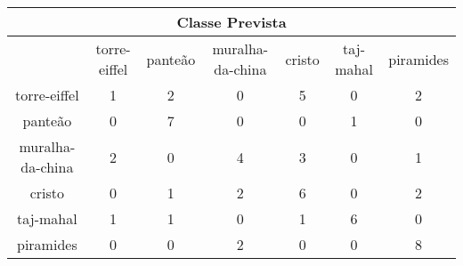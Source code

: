 \begin{tabular}{|c|c|c|c|c|c|c|}
\hline
\multicolumn{7}{|c|}{Classe Prevista}\\
\hline
 & torre-eiffel & panteão & muralha-da-china & cristo & taj-mahal & piramides\\
torre-eiffel & 1 & 2 & 0 & 5 & 0 & 2\\
panteão & 0 & 7 & 0 & 0 & 1 & 0\\
muralha-da-china & 2 & 0 & 4 & 3 & 0 & 1\\
cristo & 0 & 1 & 2 & 6 & 0 & 2\\
taj-mahal & 1 & 1 & 0 & 1 & 6 & 0\\
piramides & 0 & 0 & 2 & 0 & 0 & 8\\
\hline
\end{tabular}
